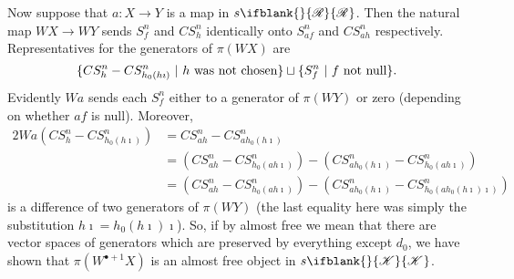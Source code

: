 \documentclass[10pt]{article}
\newcommand{\PRLie}[1]%
{\ifblank{#1}{\scrR}{\scrR^{#1}}}
\newcommand{\LL}[1]{\ifblank{#1}{\scrK}{\scrK^{#1}}}
\begin{document}
\begin{Grothendieck Multiplicativity}
Now suppose that $a:X\to Y$ is a map in $s\PRLie{}$. Then the natural map $WX\to WY$ sends $S^n_f$ and $CS^n_h$ identically onto $S^n_{af}$ and $CS^n_{ah}$ respectively. Representatives for the generators of $\pi(WX)$ are 
\[\{CS^n_h-CS^n_{h_0(h\imath)}\ |\ \textup{$h$ was not chosen}\}\sqcup\{S^n_f\ |\ \textup{$f$ not null}\}.\]
Evidently $Wa$ sends each $S^n_f$ either to a generator of $\pi(WY)$ or zero (depending on whether $af$ is null). Moreover,
\begin{alignat*}{2}
Wa(CS^n_h-CS^n_{h_0(h\imath)})
&=
CS^n_{ah}-CS^n_{ah_0(h\imath)}%
\\
&=
\left(CS^n_{ah}-CS^n_{h_0(ah\imath)}\right)-\left(CS^n_{ah_0(h\imath)}-CS^n_{h_0(ah\imath)}\right)%
\\
&=
\left(CS^n_{ah}-CS^n_{h_0(ah\imath)}\right)-\left(CS^n_{ah_0(h\imath)}-CS^n_{h_0(ah_0(h\imath)\imath)}\right)%
\end{alignat*}
is a difference of two generators of $\pi(WY)$ (the last equality here was simply the substitution $h\imath=h_0(h\imath)\imath$). So, if by almost free we mean that there are vector spaces of generators which are preserved by everything except $d_0$, we have shown that $\pi(W^{\bullet+1}X)$ is an almost free object in $s\LL{}$.

\end{Grothendieck Multiplicativity}
\end{document}
